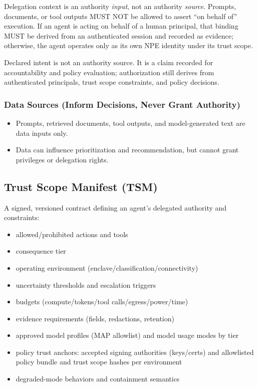 \documentclass[11pt]{article}
\begin{document}
Delegation context is an authority \emph{input}, not an authority
\emph{source}. Prompts, documents, or tool outputs MUST NOT be allowed
to assert ``on behalf of'' execution. If an agent is acting on behalf of
a human principal, that binding MUST be derived from an authenticated
session and recorded as evidence; otherwise, the agent operates only as
its own NPE identity under its trust scope.

Declared intent is not an authority source. It is a claim recorded for
accountability and policy evaluation; authorization still derives from
authenticated principals, trust scope constraints, and policy decisions.

\hypertarget{data-sources-inform-decisions-never-grant-authority}{%
\subsubsection{Data Sources (Inform Decisions, Never Grant Authority)}\label{data-sources-inform-decisions-never-grant-authority}}

\begin{itemize}
\tightlist
\item
  Prompts, retrieved documents, tool outputs, and model-generated text
  are data inputs only.
\item
  Data can influence prioritization and recommendation, but cannot grant
  privileges or delegation rights.
\end{itemize}

\hypertarget{trust-scope-manifest-tsm}{%
\subsection{Trust Scope Manifest (TSM)}\label{trust-scope-manifest-tsm}}

A signed, versioned contract defining an agent's delegated authority and
constraints:

\begin{itemize}
\tightlist
\item
  allowed/prohibited actions and tools
\item
  consequence tier
\item
  operating environment (enclave/classification/connectivity)
\item
  uncertainty thresholds and escalation triggers
\item
  budgets (compute/tokens/tool calls/egress/power/time)
\item
  evidence requirements (fields, redactions, retention)
\item
  approved model profiles (MAP allowlist) and model usage modes by tier
\item
  policy trust anchors: accepted signing authorities (keys/certs) and
  allowlisted policy bundle and trust scope hashes per environment
\item
  degraded-mode behaviors and containment semantics
\end{itemize}
\end{document}
